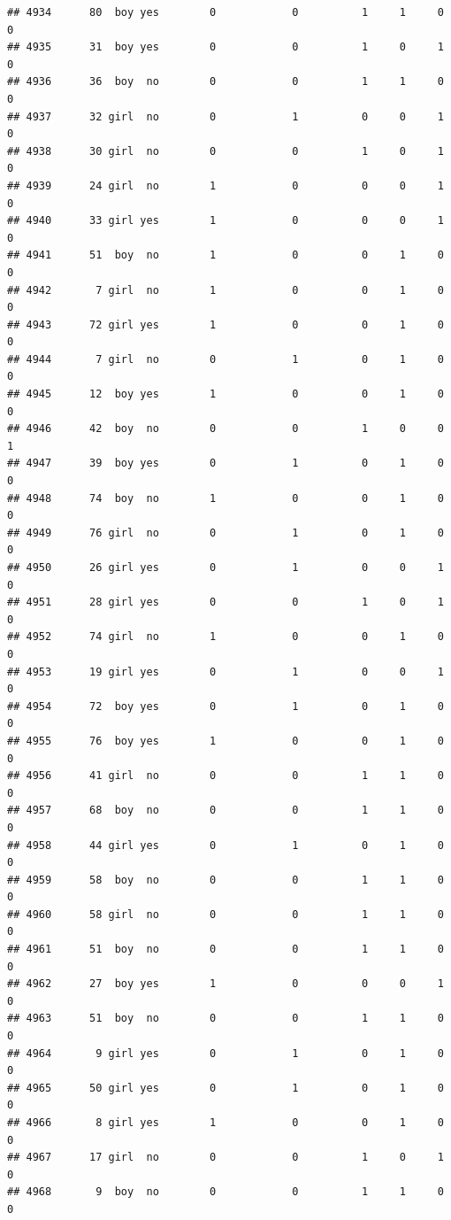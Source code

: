 \documentclass[man]{apa6}
\begin{document}
\begin{verbatim}
## 4934      80  boy yes        0            0          1     1     0     0
## 4935      31  boy yes        0            0          1     0     1     0
## 4936      36  boy  no        0            0          1     1     0     0
## 4937      32 girl  no        0            1          0     0     1     0
## 4938      30 girl  no        0            0          1     0     1     0
## 4939      24 girl  no        1            0          0     0     1     0
## 4940      33 girl yes        1            0          0     0     1     0
## 4941      51  boy  no        1            0          0     1     0     0
## 4942       7 girl  no        1            0          0     1     0     0
## 4943      72 girl yes        1            0          0     1     0     0
## 4944       7 girl  no        0            1          0     1     0     0
## 4945      12  boy yes        1            0          0     1     0     0
## 4946      42  boy  no        0            0          1     0     0     1
## 4947      39  boy yes        0            1          0     1     0     0
## 4948      74  boy  no        1            0          0     1     0     0
## 4949      76 girl  no        0            1          0     1     0     0
## 4950      26 girl yes        0            1          0     0     1     0
## 4951      28 girl yes        0            0          1     0     1     0
## 4952      74 girl  no        1            0          0     1     0     0
## 4953      19 girl yes        0            1          0     0     1     0
## 4954      72  boy yes        0            1          0     1     0     0
## 4955      76  boy yes        1            0          0     1     0     0
## 4956      41 girl  no        0            0          1     1     0     0
## 4957      68  boy  no        0            0          1     1     0     0
## 4958      44 girl yes        0            1          0     1     0     0
## 4959      58  boy  no        0            0          1     1     0     0
## 4960      58 girl  no        0            0          1     1     0     0
## 4961      51  boy  no        0            0          1     1     0     0
## 4962      27  boy yes        1            0          0     0     1     0
## 4963      51  boy  no        0            0          1     1     0     0
## 4964       9 girl yes        0            1          0     1     0     0
## 4965      50 girl yes        0            1          0     1     0     0
## 4966       8 girl yes        1            0          0     1     0     0
## 4967      17 girl  no        0            0          1     0     1     0
## 4968       9  boy  no        0            0          1     1     0     0

\end{verbatim}
\end{document}
